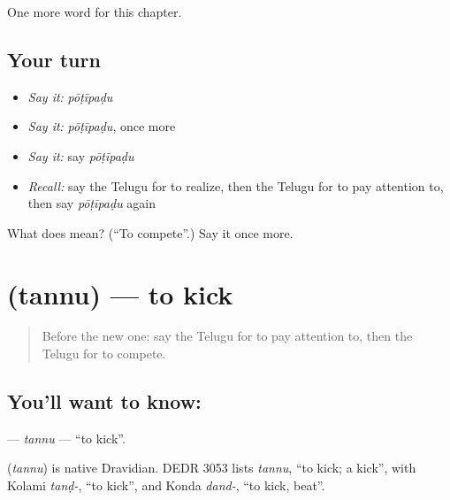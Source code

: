 \begin{grammarlens}[title={What you've built}]
One more word for this chapter.
\end{grammarlens}

\subsection*{Your turn}
\begin{itemize}
\raggedright
  \item \emph{Say it:} \emph{pōṭīpaḍu}
  \item \emph{Say it:} \emph{pōṭīpaḍu}, once more
  \item \emph{Say it:} say \emph{pōṭīpaḍu}
  \item \emph{Recall:} say the Telugu for to realize, then the Telugu for to pay attention to, then say \emph{pōṭīpaḍu} again
\end{itemize}

\begin{tcolorbox}[breakable,colback=teal!4,colframe=teal!35!black,title={Before you move on}]
What does  mean? (\textquotedblleft{}To compete\textquotedblright{}.) Say it once more.
\end{tcolorbox}
\section[\texorpdfstring{\te{తన్ను} (tannu)}{తన్ను (tannu)}]{ (tannu) — to kick}

\label{lesson:TE-C163-tannu}



\begin{quote}
Before the new one: say the Telugu for to pay attention to, then the Telugu for to compete.
\end{quote}

\subsection*{You'll want to know: }
\textbf{} — \emph{tannu} — \textquotedblleft{}to kick\textquotedblright{}.

\begin{cousinweb}
\textbf{} (\emph{tannu}) is native Dravidian. DEDR 3053 lists \emph{tannu}, \textquotedblleft{}to kick; a kick\textquotedblright{}, with Kolami \emph{tanḍ-}, \textquotedblleft{}to kick\textquotedblright{}, and Konda \emph{dand-}, \textquotedblleft{}to kick, beat\textquotedblright{}.
\end{cousinweb}

